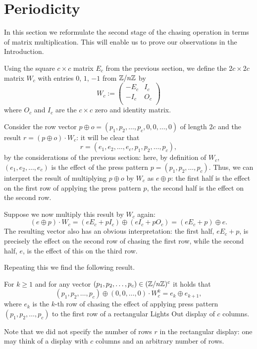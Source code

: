 \section{Periodicity}\label{sec:algebra}
In this section we reformulate the second stage of
the chasing operation in terms of matrix multiplication.
This will enable us to prove our observations in the Introduction.

Using the square $c\times c$ matrix $E_c$ from the previous
section, we define the $2c\times 2c$ matrix $W_{c}$ with entries $0$, $1$, $-1$ from
$\mathbb{Z}/n\mathbb{Z}$ by
\[
W_{c} := \left(
\begin{array}{cc}
  -E_{c} & I_{c} \\
  -I_{c} & O_{c} \\
\end{array}
\right)
\]
where $O_c$ and $I_c$ are the $c\times c$ zero and
identity matrix.

Consider the row vector $p\oplus o=(p_1, p_2, \ldots, p_c, 0, 0, \ldots, 0)$
of length $2c$ and the result $r=(p\oplus o)\cdot W_c$: it will be clear that
$$r=(e_1, e_2, \ldots, e_c, p_1, p_2, \ldots, p_c),$$
by the considerations of the previous section:
here, by definition of $W_c$,
$(e_1, e_2, \ldots, e_c)$ is the effect of
the press pattern $p=(p_1, p_2, \ldots, p_c)$. Thus, we can
interpret the result of multiplying $p\oplus o$ by $W_c$
as $e\oplus p$: the first half is the effect on the first
row of applying the press pattern $p$, the second half is the
effect on the second row.

Suppose we now multiply this result by $W_c$ again:
$$(e\oplus p)\cdot W_c=(eE_c+pI_c)\oplus (eI_c+pO_c)=(eE_c+p)\oplus e.$$
The resulting vector also has an obvious interpretation:
the first half, $eE_c+p$, is precisely the effect on
the second row of chasing the first row, while the
second half, $e$, is the effect of this on the third row.

Repeating this we find the following result.

\begin{lemma}
For $k\geq 1$ and for any vector
$(p_1, p_2, \ldots, p_c)\in (\mathbb{Z}/n\mathbb{Z})^c$ it holds that
$$(p_1, p_2, \ldots, p_c)\oplus (0, 0, \ldots,0)\cdot W_c^k=e_k\oplus e_{k+1},$$
where $e_k$ is the $k$-th row of chasing the effect of applying
press pattern $(p_1, p_2, \ldots, p_c)$ to the first row of a
rectangular Lights Out display of $c$ columns.
\end{lemma}
Note that we did not specify the number of rows $r$ in the rectangular
display: %
one may think of a display with $c$ columns and an arbitrary number
of rows.

